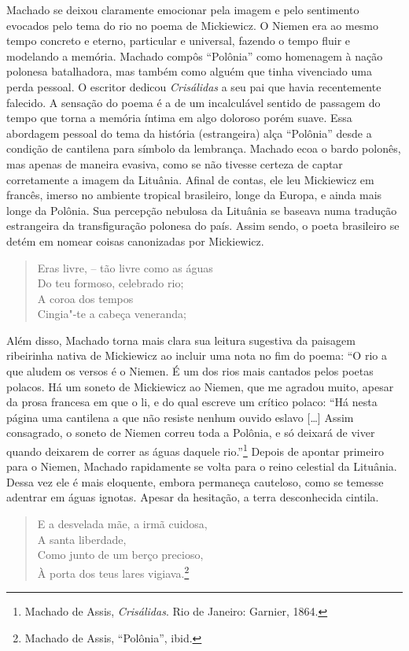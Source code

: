 Machado se deixou claramente emocionar pela imagem e pelo sentimento
evocados pelo tema do rio no poema de Mickiewicz. O Niemen era ao mesmo
tempo concreto e eterno, particular e universal, fazendo o tempo fluir e
modelando a memória. Machado compôs ``Polônia'' como homenagem à
nação polonesa batalhadora, mas também como alguém que tinha vivenciado
uma perda pessoal. O escritor dedicou \textit{Crisálidas} a seu pai que
havia recentemente falecido. A sensação do poema é a de um incalculável
sentido de passagem do tempo que torna a memória íntima em algo doloroso
porém suave. Essa abordagem pessoal do tema da história (estrangeira)
alça ``Polônia'' desde a condição de cantilena para símbolo da
lembrança. Machado ecoa o bardo polonês, mas apenas de maneira evasiva,
como se não tivesse certeza de captar corretamente a imagem da Lituânia.
Afinal de contas, ele leu Mickiewicz em francês, imerso no ambiente
tropical brasileiro, longe da Europa, e ainda mais longe da Polônia. Sua
percepção nebulosa da Lituânia se baseava numa tradução estrangeira da
transfiguração polonesa do país. Assim sendo, o poeta brasileiro se
detém em nomear coisas canonizadas por Mickiewicz.

\begin{verse}
Eras livre, -- tão livre como as águas \\
Do teu formoso, celebrado rio;\\
A coroa dos tempos\\
Cingia"-te a cabeça veneranda;
\end{verse}

Além disso, Machado torna mais clara sua leitura sugestiva da paisagem
ribeirinha nativa de Mickiewicz ao incluir uma nota no fim do poema: ``O
rio a que aludem os versos é o Niemen. É um dos rios mais cantados pelos
poetas polacos. Há um soneto de Mickiewicz ao Niemen, que me agradou
muito, apesar da prosa francesa em que o li, e do qual escreve um
crítico polaco: ``Há nesta página uma cantilena a que não resiste nenhum
ouvido eslavo {[}\ldots{}{]} Assim consagrado, o soneto de Niemen correu
toda a Polônia, e só deixará de viver quando deixarem de correr as águas
daquele rio.''\footnote{Machado de Assis, \textit{Crisálidas}. Rio de Janeiro: Garnier, 1864.} Depois de apontar primeiro para o Niemen,
Machado rapidamente se volta para o reino celestial da Lituânia. Dessa
vez ele é mais eloquente, embora permaneça cauteloso, como se temesse
adentrar em águas ignotas. Apesar da hesitação, a terra desconhecida
cintila.

\begin{verse}
E a desvelada mãe, a irmã cuidosa,\\
A santa liberdade,\\
Como junto de um berço precioso,\\
À porta dos teus lares vigiava.\footnote{Machado de Assis, ``Polônia'', ibid.}
\end{verse}

